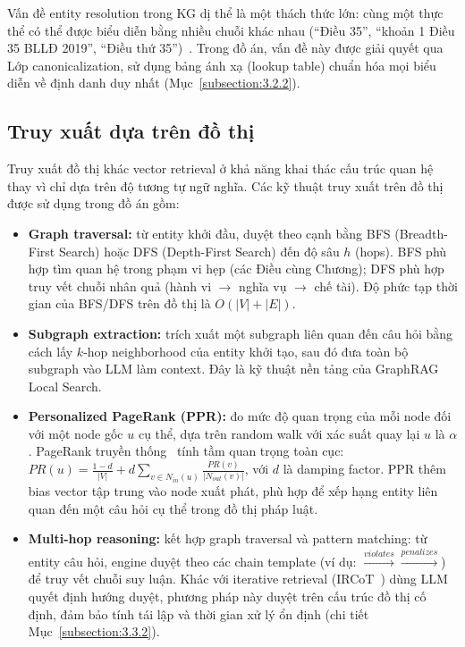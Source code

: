 \documentclass[../DoAn.tex]{subfiles}
\begin{document}
Vấn đề entity resolution trong KG dị thể là một thách thức lớn: cùng một thực thể có thể được biểu diễn bằng nhiều chuỗi khác nhau (``Điều 35'', ``khoản 1 Điều 35 BLLĐ 2019'', ``Điều thứ 35'')~\cite{ji2022kgsurvey}. Trong đồ án, vấn đề này được giải quyết qua Lớp canonicalization, sử dụng bảng ánh xạ (lookup table) chuẩn hóa mọi biểu diễn về định danh duy nhất (Mục~\ref{subsection:3.2.2}).

\subsection{Truy xuất dựa trên đồ thị}
\label{subsection:graph_retrieval}

Truy xuất đồ thị khác vector retrieval ở khả năng khai thác cấu trúc quan hệ thay vì chỉ dựa trên độ tương tự ngữ nghĩa. Các kỹ thuật truy xuất trên đồ thị được sử dụng trong đồ án gồm:

\begin{itemize}[nosep, leftmargin=*]
    \item \textbf{Graph traversal:} từ entity khởi đầu, duyệt theo cạnh bằng BFS (Breadth-First Search) hoặc DFS (Depth-First Search) đến độ sâu $h$ (hops). BFS phù hợp tìm quan hệ trong phạm vi hẹp (các Điều cùng Chương); DFS phù hợp truy vết chuỗi nhân quả (hành vi $\rightarrow$ nghĩa vụ $\rightarrow$ chế tài). Độ phức tạp thời gian của BFS/DFS trên đồ thị là $O(|V| + |E|)$.
    \item \textbf{Subgraph extraction:} trích xuất một subgraph liên quan đến câu hỏi bằng cách lấy $k$-hop neighborhood của entity khởi tạo, sau đó đưa toàn bộ subgraph vào LLM làm context. Đây là kỹ thuật nền tảng của GraphRAG Local Search.
    \item \textbf{Personalized PageRank (PPR):} đo mức độ quan trọng của mỗi node đối với một node gốc $u$ cụ thể, dựa trên random walk với xác suất quay lại $u$ là $\alpha$. PageRank truyền thống~\cite{brin1998pagerank} tính tầm quan trọng toàn cục: $PR(u) = \frac{1-d}{|V|} + d \sum_{v \in N_{in}(u)} \frac{PR(v)}{|N_{out}(v)|}$, với $d$ là damping factor. PPR thêm bias vector tập trung vào node xuất phát, phù hợp để xếp hạng entity liên quan đến một câu hỏi cụ thể trong đồ thị pháp luật.
    \item \textbf{Multi-hop reasoning:} kết hợp graph traversal và pattern matching: từ entity câu hỏi, engine duyệt theo các chain template (ví dụ: $\xrightarrow{violates} \xrightarrow{penalizes}$) để truy vết chuỗi suy luận. Khác với iterative retrieval (IRCoT~\cite{trivedi2022ircot}) dùng LLM quyết định hướng duyệt, phương pháp này duyệt trên cấu trúc đồ thị cố định, đảm bảo tính tái lập và thời gian xử lý ổn định (chi tiết Mục~\ref{subsection:3.3.2}).
\end{itemize}
\end{document}
